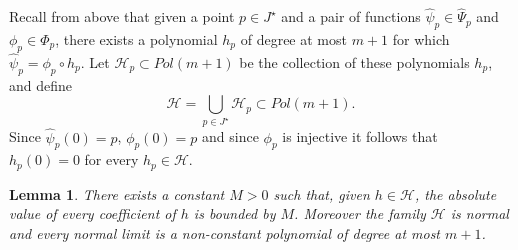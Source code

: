 \documentclass[10pt,a4paper]{article}
\newtheorem{lemma}[theorem]{Lemma}
\begin{document}
Recall from above that given a point $p\in J^\star$ and a pair of functions $\widehat\psi_p\in\widehat\Psi_p$ and $\phi_p\in\Phi_p$, there exists a polynomial $h_p$ of degree at most $m+1$ for which $\widehat\psi_p=\phi_p\circ h_p$. Let $\mathcal H_p\subset Pol(m+1)$ be the collection of these polynomials $h_p$, and define
\[
\mathcal H=\bigcup_{p\in J^\star} \mathcal H_p\subset Pol(m+1).
\]
Since $\widehat\psi_p(0)=p$, $\phi_p(0)=p$ and since $\phi_p$ is injective it follows that $h_p(0)=0$ for every $h_p\in\mathcal H$.
\begin{lemma}
\label{normalfamilypoly}
There exists a constant $M>0$ such that, given $h\in\mathcal H$, the absolute value of every coefficient of $h$ is bounded by $M$. Moreover the family $\mathcal H$ is normal and every normal limit is a non-constant polynomial of degree at most $m+1$.
\end{lemma}
\end{document}
